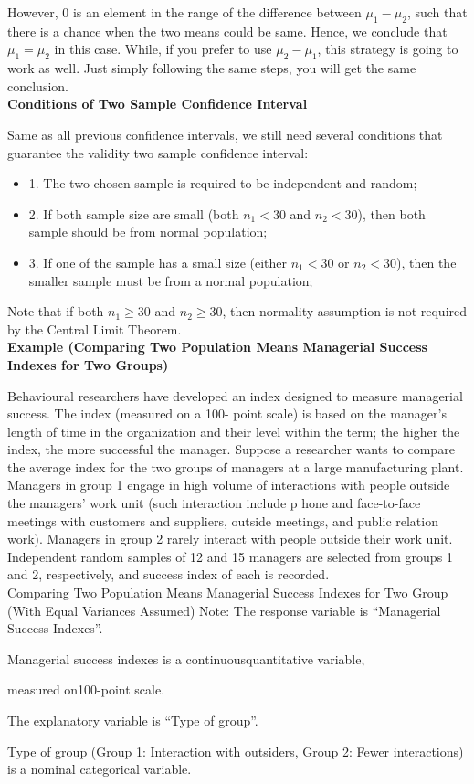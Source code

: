 However, 0 is an element in the range of the difference between $\mu_1 - \mu_2$, such that there is a chance when the two means could be same. Hence, we conclude that $\mu_1 = \mu_2$ in this case. While, if you prefer to use $\mu_2 - \mu_1$, this strategy is going to work as well. Just simply following the same steps, you will get the same conclusion.\\

\textbf{Conditions of Two Sample Confidence Interval}

Same as all previous confidence intervals, we still need several conditions that guarantee the validity two sample confidence interval:

\begin{itemize}
	\item 1. The two chosen sample is required to be independent and random;
	\item 2. If both sample size are small (both $n_1 < 30$ and $n_2 < 30$), then both sample should be from normal population;
	\item 3. If one of the sample has a small size (either $n_1 < 30$ or $n_2 < 30$), then the smaller sample must be from a normal population;
\end{itemize}

Note that if both $n_1 \ge 30$ and $n_2 \ge 30$, then normality assumption is not required by the Central Limit Theorem.\\

\textbf{Example (Comparing Two Population Means Managerial Success Indexes for Two Groups)}

\begin{example}
Behavioural researchers have developed an index designed to measure managerial success. The index (measured on a 100- point scale) is based on the manager’s length of time in the organization and their level within the term; the higher the index, the more successful the manager. Suppose a researcher wants to compare the average index for the two groups of managers at a large manufacturing plant. Managers in group 1 engage in high volume of interactions with people outside the managers’ work unit (such interaction include p hone and face-to-face meetings with customers and suppliers, outside meetings, and public relation work). Managers in group 2 rarely interact with people outside their work unit. Independent random samples of 12 and 15 managers are selected from groups 1 and 2, respectively, and success index of each is recorded.\\
Comparing Two Population Means Managerial Success Indexes for Two Group (With Equal Variances Assumed) Note: The response variable is “Managerial Success Indexes”.

Managerial success indexes is a continuousquantitative variable,

measured on100-point scale.

The explanatory variable is “Type of group”.

Type of group (Group 1: Interaction with outsiders, Group 2: Fewer interactions) is a nominal categorical variable.
\end{example}

